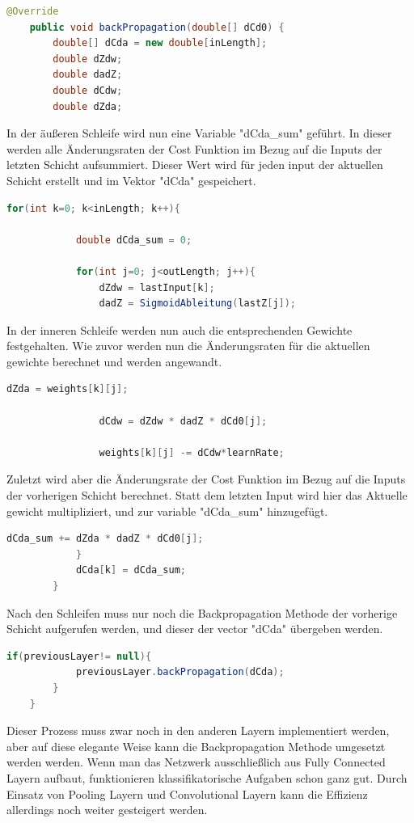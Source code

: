 \documentclass[12pt]{article}
\begin{document}
\begin{lstlisting}[language=Java]
    @Override
    public void backPropagation(double[] dCd0) {
        double[] dCda = new double[inLength];
        double dZdw;
        double dadZ;
        double dCdw;
        double dZda;
\end{lstlisting} 
In der äußeren Schleife wird nun eine Variable "dCda\_sum" geführt. In dieser werden alle Änderungsraten der Cost Funktion im Bezug auf die Inputs der letzten Schicht aufsummiert. Dieser Wert wird für jeden input der aktuellen Schicht erstellt und im Vektor "dCda" gespeichert.
\begin{lstlisting}[language=Java]  
        for(int k=0; k<inLength; k++){

            double dCda_sum = 0;

            for(int j=0; j<outLength; j++){
                dZdw = lastInput[k];
                dadZ = SigmoidAbleitung(lastZ[j]);
\end{lstlisting} 
In der inneren Schleife werden nun auch die entsprechenden Gewichte festgehalten. Wie zuvor werden nun die Änderungsraten für die aktuellen gewichte berechnet und werden angewandt.
\begin{lstlisting}[language=Java]  
                dZda = weights[k][j]; 

                dCdw = dZdw * dadZ * dCd0[j];

                weights[k][j] -= dCdw*learnRate;
\end{lstlisting} 
Zuletzt wird aber die Änderungsrate der Cost Funktion im Bezug auf die Inputs der vorherigen Schicht berechnet. Statt dem letzten Input wird hier das Aktuelle gewicht multipliziert, und zur variable "dCda\_sum" hinzugefügt.
\begin{lstlisting}[language=Java]              
                dCda_sum += dZda * dadZ * dCd0[j];
            }
            dCda[k] = dCda_sum;
        }
\end{lstlisting} 
Nach den Schleifen muss nur noch die Backpropagation Methode der vorherige Schicht aufgerufen werden, und dieser der vector "dCda" übergeben werden.
\begin{lstlisting}[language=Java]   
        if(previousLayer!= null){
            previousLayer.backPropagation(dCda);
        }
    }
\end{lstlisting} 

Dieser Prozess muss zwar noch in den anderen Layern implementiert werden, aber auf diese elegante Weise kann die Backpropagation Methode umgesetzt werden werden. Wenn man das Netzwerk ausschließlich aus Fully Connected Layern aufbaut, funktionieren klassifikatorische Aufgaben schon ganz gut. Durch Einsatz von Pooling Layern und Convolutional Layern kann die Effizienz allerdings noch weiter gesteigert werden.
\end{document}

